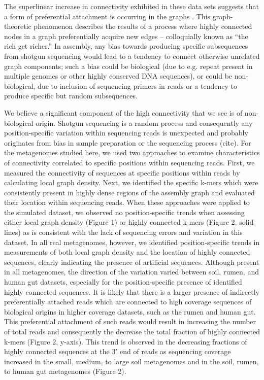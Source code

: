 \documentclass[10pt]{article}
\begin{document}
The superlinear increase in connectivity exhibited in these data sets
suggests that a form of preferential attachment is occurring in the
graphs \cite{Barabasi:1999p1083}.  This graph-theoretic phenomenon
describes the results of a process where highly connected nodes in a
graph preferentially acquire new edges -- colloquially known as ``the
rich get richer.''  In assembly, any bias towards producing specific
subsequences from shotgun sequencing would lead to a tendency to
connect otherwise unrelated graph components; such a bias could be
biological (due to e.g. repeat present in multiple genomes or other
highly conserved DNA sequences), or could be non-biological, due to
inclusion of sequencing primers in reads or a tendency to produce
specific but random subsequences.


We believe a significant component of the high connectivity that we
see is of non-biological origin.  Shotgun sequencing is a random
process and consequently any position-specific variation within
sequencing reads is unexpected and probably originates from bias in
sample preparation or the sequencing process (cite).  For the
metagenomes studied here, we used two approaches to examine
characteristics of connectivity correlated to specific positions
within sequencing reads.  First, we measured the connectivity of
sequences at specific positions within reads by calculating local
graph density.  Next, we identified the specific k-mers which were
consistently present in highly dense regions of the assembly graph and
evaluated their location within sequencing reads.  When these
approaches were applied to the simulated dataset, we observed no
position-specific trends when assessing either local graph density
(Figure 1) or highly connected k-mers (Figure 2, solid lines) as is
consistent with the lack of sequencing errors and variation in this
dataset.  In all real metagenomes, however, we identified
position-specific trends in measurements of both local graph density
and the location of highly connected sequences, clearly indicating the
presence of artificial sequences.  Although present in all
metagenomes, the direction of the variation varied between soil,
rumen, and human gut datasets, especially for the position-specific
presence of identified highly connected sequences.  It is likely that
there is a larger presence of indirectly preferentially attached reads
which are connected to high coverage sequences of biological origins
in higher coverage datasets, such as the rumen and human gut.  This
preferential attachment of such reads would result in increasing the
number of total reads and consequently the decrease the total fraction
of highly connected k-mers (Figure 2, y-axis).  This trend is observed
in the decreasing fractions of highly connected sequences at the 3'
end of reads as sequencing coverage increased in the small, medium, to
large soil metagenomes and in the soil, rumen, to human gut
metagenomes (Figure 2).
\end{document}
